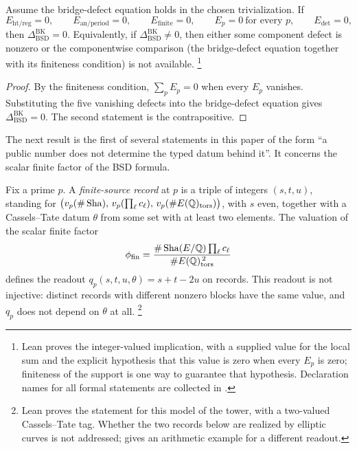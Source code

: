 \begin{theorem}
\label{thm:apparatus:component-killing}
Assume the bridge-defect equation holds in the chosen trivialization.  If
\[
  E_{\mathrm{ht/reg}}=0,\qquad
  E_{\mathrm{an/period}}=0,\qquad
  E_{\mathrm{finite}}=0,\qquad
  E_p=0\ \text{for every }p,\qquad
  E_{\det}=0,
\]
then $\Delta_{\mathrm{BSD}}^{\mathrm{BK}}=0$.  Equivalently, if
$\Delta_{\mathrm{BSD}}^{\mathrm{BK}}\neq 0$, then either some component
defect is nonzero or the componentwise comparison (the bridge-defect
equation together with its finiteness condition) is not available.%
\footnote{Lean proves the integer-valued implication, with a supplied
value for the local sum and the explicit hypothesis that this value is
zero when every $E_p$ is zero; finiteness of the support is one way to
guarantee that hypothesis.  Declaration names for all formal statements
are collected in .}
\end{theorem}

\begin{proof}
By the finiteness condition, $\sum_pE_p=0$ when every $E_p$ vanishes.
Substituting the five vanishing defects into the bridge-defect equation
gives $\Delta_{\mathrm{BSD}}^{\mathrm{BK}}=0$.  The second statement is
the contrapositive.
\end{proof}

The next result is the first of several statements in this paper of the
form ``a public number does not determine the typed datum behind it''.  It
concerns the scalar finite factor of the BSD formula.

\begin{theorem}
\label{thm:apparatus:finite-scalar-public-shadow}
Fix a prime $p$.  A \emph{finite-source record} at $p$ is a triple of
integers $(s,t,u)$, standing for
$\bigl(v_p(\#\operatorname{Sha}),\,v_p(\prod_\ell c_\ell),\,v_p(\#E(\mathbb{Q})_{\operatorname{tors}})\bigr)$,
with $s$ even, together with a Cassels--Tate datum $\theta$ from some set
with at least two elements.  The valuation of the scalar finite factor
\[
  \phi_{\mathrm{fin}}
  =
  \frac{\#\operatorname{Sha}(E/\mathbb{Q})\prod_\ell c_\ell}{\#E(\mathbb{Q})_{\operatorname{tors}}^{\,2}}
\]
defines the readout $q_p(s,t,u,\theta)=s+t-2u$ on records.  This readout
is not injective: distinct records with different nonzero blocks have the
same value, and $q_p$ does not depend on $\theta$ at all.%
\footnote{Lean proves the statement for this model of the tower, with a
two-valued Cassels--Tate tag.  Whether the two records below are realized
by elliptic curves is not addressed;  gives an
arithmetic example for a different readout.}
\end{theorem}


